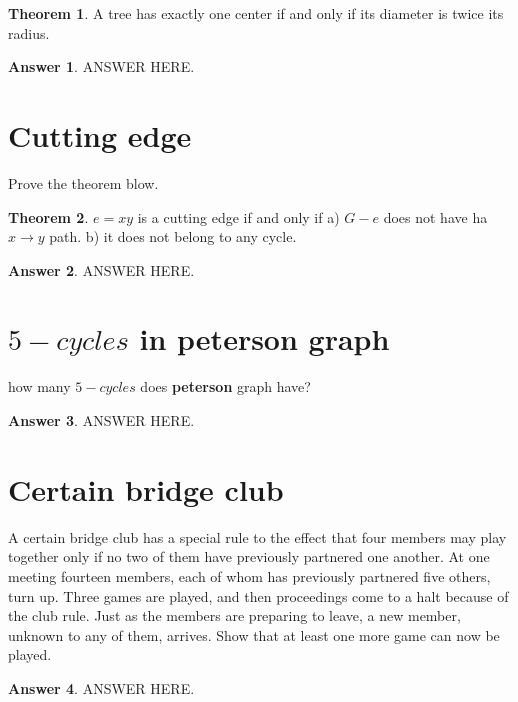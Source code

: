 \documentclass[a4paper]{article}
\renewcommand{\(}{\left(}
\renewcommand{\)}{\right)}
\theoremstyle{plain}
\theoremstyle{plain}
\theoremstyle{definition}
\newtheorem*{answer}{Answer}
\newtheorem{theorem}{Theorem}[section]
\begin{document}
\begin{theorem}
A tree has exactly one center if and only if its diameter is twice its radius.
\end{theorem}
\begin{shaded}
\begin{answer}
ANSWER HERE.
\end{answer}
\end{shaded}

\section{Cutting edge}
Prove the theorem blow.
\begin{theorem}
$e = xy$ is a cutting edge if and only if
a) $G-e$ does not have ha $x \rightarrow y$ path.
b) it does not belong to any cycle.
\end{theorem}
\begin{shaded}
\begin{answer}
ANSWER HERE.
\end{answer}
\end{shaded}

\section{$5-cycles$ in peterson graph}
how many $5-cycles$ does \textbf{peterson} graph have?
\begin{shaded}
\begin{answer}
ANSWER HERE.
\end{answer}
\end{shaded}

\section{Certain bridge club}
A certain bridge club has a special rule to the effect that four members may play together only if no two of them have previously partnered one another. At one meeting fourteen members, each of whom has previously partnered five others, turn up. Three games are played, and then proceedings come to a halt because of the club rule. Just as the members are preparing to leave, a new member, unknown to any of them, arrives. Show that at least one more game can now be played.
\begin{shaded}
\begin{answer}
ANSWER HERE.
\end{answer}
\end{shaded}
\end{document}
